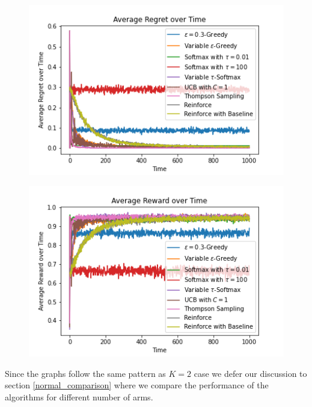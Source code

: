 \documentclass{article}
\begin{document}
			\begin{figure}[H]
			\graphicspath{ {../Experiments/Normal_5_0.01_every_case/} }
			\centering
			\begin{minipage}{.5\textwidth}
			  \centering
			  \includegraphics[width=\linewidth]{Average_Regret_over_Time.png}
			  \label{fig:test1}
			\end{minipage}%
			\begin{minipage}{.5\textwidth}
			  \centering
			  \includegraphics[width=\linewidth]{Average_Reward_over_Time.png}
			  \label{fig:test2}
			\end{minipage}
			\end{figure}
		
		Since the graphs follow the same pattern as $K=2$ case we defer our discussion to section \ref{normal_comparison} where we compare the performance of the algorithms for
		different number of arms.
		
\end{document}
